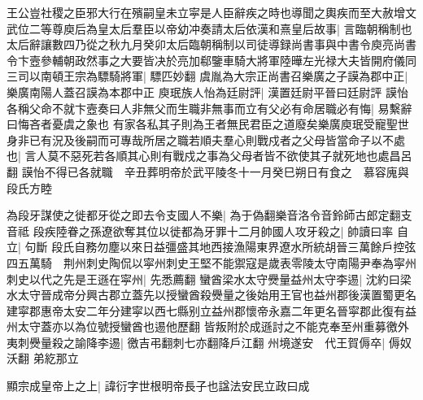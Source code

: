 王公豈社稷之臣邪大行在殯嗣皇未立寜是人臣辭疾之時也導聞之輿疾而至大赦增文武位二等尊庾后為皇太后羣臣以帝幼冲奏請太后依漢和熹皇后故事|{
	言臨朝稱制也}
太后辭讓數四乃從之秋九月癸卯太后臨朝稱制以司徒導録尚書事與中書令庾亮尚書令卞壼參輔朝政然事之大要皆决於亮加郗鑒車騎大將軍陸曄左光禄大夫皆開府儀同三司以南頓王宗為驃騎將軍|{
	驃匹妙翻}
虞胤為大宗正尚書召樂廣之子謨為郡中正|{
	樂廣南陽人蓋召謨為本郡中正}
庾珉族人怡為廷尉評|{
	漢置廷尉平晉曰廷尉評}
謨怡各稱父命不就卞壼奏曰人非無父而生職非無事而立有父必有命居職必有悔|{
	易繫辭曰悔吝者憂虞之象也}
有家各私其子則為王者無民君臣之道廢矣樂廣庾珉受寵聖世身非已有況及後嗣而可專哉所居之職若順夫羣心則戰戍者之父母皆當命子以不處也|{
	言人莫不惡死若各順其心則有戰戍之事為父母者皆不欲使其子就死地也處昌呂翻}
謨怡不得已各就職　辛丑葬明帝於武平陵冬十一月癸巳朔日有食之　慕容廆與段氏方睦

為段牙謀使之徙都牙從之即去令支國人不樂|{
	為于偽翻樂音洛令音鈴師古郎定翻支音祗}
段疾陸眷之孫遼欲奪其位以徙都為牙罪十二月帥國人攻牙殺之|{
	帥讀曰率}
自立|{
	句斷}
段氏自務勿塵以來日益彊盛其地西接漁陽東界遼水所統胡晉三萬餘戶控弦四五萬騎　荆州刺史陶侃以寜州刺史王堅不能禦寇是歲表零陵太守南陽尹奉為寜州刺史以代之先是王遜在寜州|{
	先悉薦翻}
蠻酋梁水太守㸑量益州太守李逷|{
	沈約曰梁水太守晉成帝分興古郡立蓋先以授蠻酋殺㸑量之後始用王官也益州郡後漢置蜀更名建寜郡惠帝太安二年分建寜以西七縣别立益州郡懷帝永嘉二年更名晉寜郡此復有益州太守蓋亦以為位號授蠻酋也逷他歷翻}
皆叛附於成遜討之不能克奉至州重募徼外夷刺㸑量殺之諭降李逷|{
	徼吉弔翻刺七亦翻降戶江翻}
州境遂安　代王賀傉卒|{
	傉奴沃翻}
弟紇那立

顯宗成皇帝上之上|{
	諱衍字世根明帝長子也諡法安民立政曰成}


